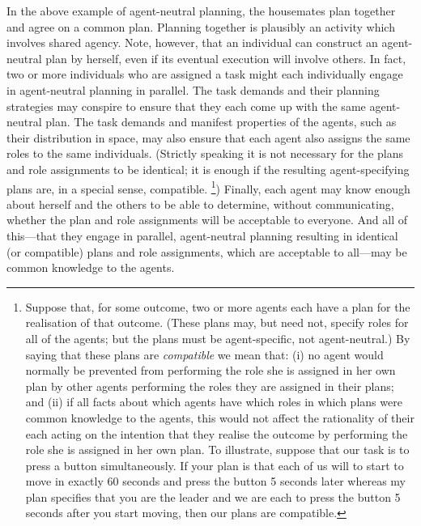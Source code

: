 \documentclass[12pt,\papersize]{extarticle}
\begin{document}
In the above example of agent-neutral planning,
	the housemates plan together and agree on a common plan.
	Planning together is plausibly an activity which involves shared agency.
	Note, however, that an individual can construct an agent-neutral plan by herself, even if its eventual execution will involve others.
	In fact, two or more individuals who are assigned a task might each individually engage in agent-neutral planning in parallel.
	The task demands and their planning strategies may conspire to ensure that they each come up with the same agent-neutral plan.
	The task demands and manifest properties of the agents, such as their distribution in space, may also ensure that each agent also assigns the same roles to the same individuals.
(Strictly speaking it is not necessary for the plans and role assignments to be identical; it is enough if the resulting agent-specifying plans are, in a special sense, compatible.%
\footnote{
\label{fn:df_compatible}
Suppose that, for some outcome, two or more agents each have a plan for the realisation of that outcome. 
(These plans may, but need not, specify roles for all of the agents; but the plans must be agent-specific, not agent-neutral.)
By saying that these plans are \emph{compatible} we mean that:
(i) 
no agent would normally be prevented from performing the role she is assigned in her own plan by other agents performing the roles they are assigned in their plans;
and
(ii)
if all facts about which agents have which roles in which plans were common knowledge to the agents,
this would not affect the rationality of their each acting on the intention that they realise the outcome by performing the role she is assigned in her own plan.
To illustrate, suppose that our task is to press a button simultaneously. 
If your plan is that each of us will to start to move in exactly 60 seconds and press the button 5 seconds later whereas my plan specifies that you are the leader and we are each to press the button 5 seconds after you start moving, then our plans are compatible.
})
%
Finally, each agent may know enough about herself and the others to be able to determine, without communicating, whether the plan and role assignments will be acceptable to everyone. 
	And all of this---that they engage in parallel, agent-neutral planning resulting in identical (or compatible) plans and role assignments, which are acceptable to all---may be common knowledge to the agents.
\end{document}
